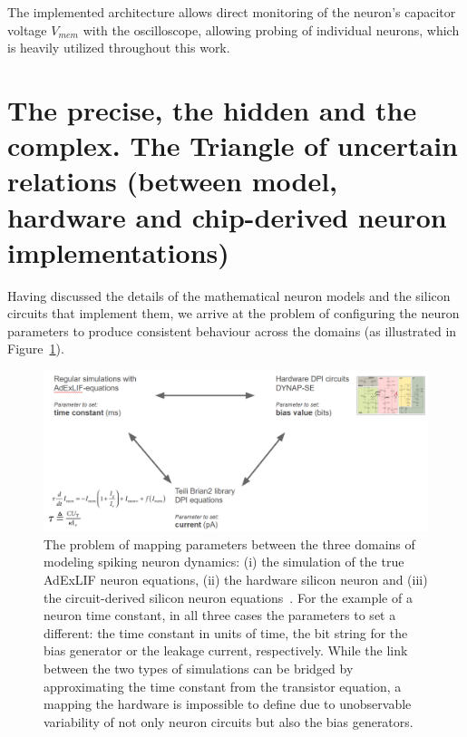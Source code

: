 The implemented architecture allows direct monitoring of the neuron's capacitor voltage $V_{mem}$ with the oscilloscope, allowing probing of individual neurons, which is heavily utilized throughout this work.

\newpage
\section{The precise, the hidden and the complex. The Triangle of uncertain relations (between model, hardware and chip-derived neuron implementations)}
\label{subsec:triangle_of_relations}

Having discussed the details of the mathematical neuron models and the silicon circuits that implement them, we arrive at the problem of configuring the neuron parameters to produce consistent behaviour across the domains (as illustrated in Figure~\ref{fig:triangle_of_relations}).

\begin{figure}[h]
  \centering
  \includegraphics[width=.9\textwidth]{img/chapter4/Triangle_of_uncertainty.png}
  \caption[The problem of mapping between the three domains of modeling spiking neuron dynamics.]{The problem of mapping parameters between the three domains of modeling spiking neuron dynamics: (i) the simulation of the true AdExLIF neuron equations, (ii) the hardware silicon neuron and (iii) the circuit-derived silicon neuron equations~\cite{Milde_etal18}. For the example of a neuron time constant, in all three cases the parameters to set a different: the time constant in units of time, the bit string for the bias generator or the leakage current, respectively. While the link between the two types of simulations can be bridged by approximating the time constant from the transistor equation, a mapping the hardware is impossible to define due to unobservable variability of not only neuron circuits but also the bias generators.}
  \label{fig:triangle_of_relations}
\end{figure}

